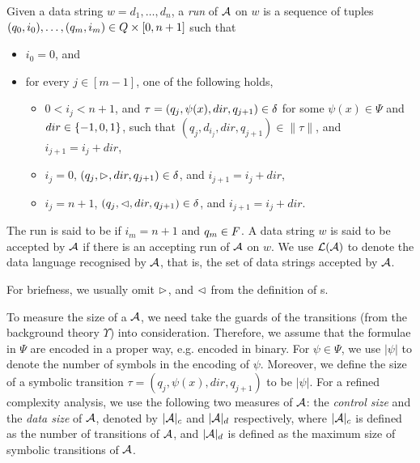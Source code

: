 Given a data string $w = d_1, \dots, d_n$, a \emph{run} of $\mathcal{A}$ on $w$
is a sequence of tuples $(q_0, i_0), \ldots, (q_m, i_m) \in Q \times [0, n+1]$ 
such that
\begin{itemize}
    \item $i_0 = 0$, and
    \item for every $j \in [m-1]$, one of the following holds,
    \begin{itemize}
  	\item $0 < i_j < n+1$,  and $\tau=(q_j, \psi(x), dir, q_{j+1}) \in \delta$ for some $\psi(x) \in \Psi$ and $dir \in \{-1, 0, 1\}$, such that $(q_j, d_{i_j}, dir, q_{j+1}) \in \|\tau\|$, and $i_{j+1} = i_j + dir$,
	\item $i_j = 0$, $(q_j, \vartriangleright, dir, q_{j+1}) \in \delta$, and $i_{j+1} = i_j + dir$,
	\item $i_j = n+1$, $(q_j, \vartriangleleft, dir, q_{j+1}) \in \delta$, and $i_{j+1} = i_j + dir$.
  \end{itemize}
\end{itemize}
The run is said to be  if $i_m = n+1$ and $q_m \in F$.
A data string $w$ is said to be accepted by $\mathcal{A}$ if there is an accepting run of
$\mathcal{A}$ on $w$. We use $\mathcal{L}(\mathcal{A})$ to denote the data language recognised by $\mathcal{A}$, that is,  the set of data strings accepted by $\mathcal{A}$.

For briefness, we usually omit $\vartriangleright$, and $\vartriangleleft$ from the definition of \SSA{}s. 

To measure the size of a \SSA{} $\mathcal{A}$, we need take the guards of the transitions (from the background theory $\Upsilon$) into  consideration. Therefore, we assume that the formulae in $\Psi$ are encoded in a proper way, e.g. encoded in binary. For $\psi \in \Psi$, we use $|\psi|$ to denote the number of symbols in the encoding of $\psi$. Moreover, we define the size of a symbolic transition $\tau = (q_j, \psi(x), dir, q_{j+1})$ to be $|\psi|$.
For a refined complexity analysis, we use the following two measures of $\mathcal{A}$: %
the \emph{control size} and the \emph{data size} of $\mathcal{A}$, denoted by $|\mathcal{A}|_c$ and $|\mathcal{A}|_d$ respectively, where $|\mathcal{A}|_c$ is defined as the number of transitions of $\mathcal{A}$, and $|\mathcal{A}|_d$ is defined as the maximum size of symbolic transitions of $\mathcal{A}$.


